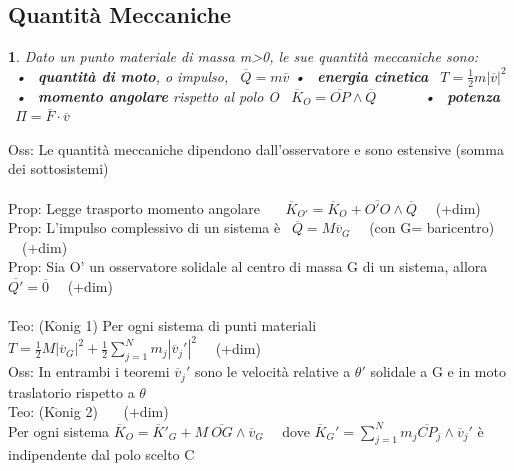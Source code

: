 \documentclass{article}
\theoremstyle{unnumbered}
\theoremstyle{unnumbered1}
\newtheorem* {theoremT1}{}
\newenvironment{Ndefi}{\begin{gBox}\begin{theoremT1}}{\end{theoremT1}\end{gBox}}
\begin{document}
\subsection{Quantità Meccaniche}
%
\begin{Ndefi}
Dato un punto materiale di massa m>0, le sue quantità meccaniche sono: \\
\ • \ \textbf{quantità di moto}, o impulso, \ $\overline{Q}=m\overline{v}$ \hspace{1.05in} • \ \textbf{energia cinetica} \ $T=\frac{1}{2}m|\overline{v}|^2$ \\
\ • \ \textbf{momento angolare} rispetto al polo O \ $\overline{K}_O = \overline{OP}\wedge\overline{Q}$ \ \ \ \ \ \ • \ \textbf{potenza} \ $\Pi = \overline{F}\cdot\overline{v}$
\end{Ndefi}
%
Oss: Le quantità meccaniche dipendono dall'osservatore e sono estensive (somma dei sottosistemi)\\ \\
%
%
%
Prop: Legge trasporto momento angolare \ \ \ $\overline{K}_{O'}=\overline{K}_O + \overline{O'O}\wedge\overline{Q}$ \ \ (+dim) \\
%
Prop: L'impulso complessivo di un sistema è \ $\overline{Q}= M \overline{v}_G$ \ \ (con G= baricentro) \ \ (+dim)\\
%
Prop: Sia O' un osservatore solidale al centro di massa G di un sistema, allora \ \ $\overline{Q'}=\overline{0}$ \ \ (+dim)\\ \\
%
%
%
Teo: (K$\ddot{\text{o}}$nig 1) Per ogni sistema di punti materiali \ \ $T=\frac{1}{2} M |\overline{v}_G|^2 + \frac{1}{2} \sum_{j=1}^N m_j |\overline{v}_j'|^2$ \ \ (+dim)\\
Oss: In entrambi i teoremi $\overline{v}_j'$ sono le velocità relative a $\theta'$ solidale a G e in moto traslatorio rispetto a $\theta$ \\
%
Teo: (K$\ddot{\text{o}}$nig 2) \ \ \ (+dim)\\
\phantom{\ } Per ogni sistema $\overline{K}_O =\overline{K}'_G + M \ \overline{OG}\wedge\overline{v}_G$  \ \ dove $\overline{K}_G' = \sum^N_{j=1} m_j \overline{CP}_j \wedge \overline{v}_j'$ è indipendente dal polo scelto C
\end{document}
